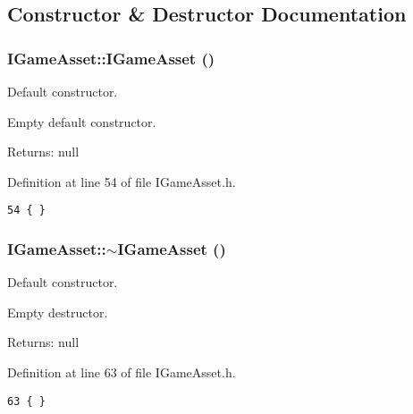 \subsection{Constructor \& Destructor Documentation}
\hypertarget{class_i_game_asset_53edef712a3f422c5390e135c0d0a90d}{
\subsubsection[IGameAsset]{\setlength{\rightskip}{0pt plus 5cm}IGameAsset::IGameAsset ()}}
\label{class_i_game_asset_53edef712a3f422c5390e135c0d0a90d}


Default constructor. 

Empty default constructor.

\begin{Desc}
\item[Returns:]null \end{Desc}


Definition at line 54 of file IGameAsset.h.

\begin{Code}\begin{verbatim}54 { }
\end{verbatim}
\end{Code}


\hypertarget{class_i_game_asset_59d0aefea418a3df2b73abdfbc911366}{
\subsubsection[$\sim$IGameAsset]{\setlength{\rightskip}{0pt plus 5cm}IGameAsset::$\sim$IGameAsset ()}}
\label{class_i_game_asset_59d0aefea418a3df2b73abdfbc911366}


Default constructor. 

Empty destructor.

\begin{Desc}
\item[Returns:]null \end{Desc}


Definition at line 63 of file IGameAsset.h.

\begin{Code}\begin{verbatim}63 { }
\end{verbatim}
\end{Code}




